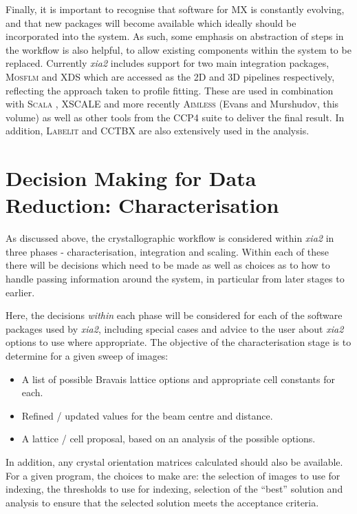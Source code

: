 \documentclass[preprint,pdf]{iucr}
\begin{document}
Finally, it is important to recognise that software for MX is
constantly evolving, and that new packages will become available which
ideally should be incorporated into the system. As such, some emphasis
on abstraction of steps in the workflow is also helpful, to allow
existing components within the system to be replaced. Currently \emph{xia2} 
includes support for two main integration packages, \textsc{Mosflm}
\cite{leslie1992rcm} and XDS \cite{Kabsch:dz5179}
which are accessed as the 2D and 3D
pipelines respectively, reflecting the approach taken to profile
fitting. These are used in combination with \textsc{Scala} \cite{Evans:ba5084}, XSCALE
and more recently \textsc{Aimless} (Evans and Murshudov, this volume) as well
as other
tools from the CCP4 suite to deliver the final result. In
addition, \textsc{Labelit} \cite{Sauter:dd5008} and CCTBX
\cite{Grosse-Kunstleve:ks0118} are also 
extensively used in the analysis.

\section{Decision Making for Data Reduction: Characterisation}

As discussed above, the crystallographic workflow is considered within
\emph{xia2} in three phases - characterisation, integration and
scaling. Within each of these there will be decisions which need to be
made as well as choices as to how to handle passing information
around the system, in particular from later stages to earlier. 

Here, the decisions \emph{within} each phase will be considered for
each of the software packages used by \emph{xia2},
including special cases and
advice to the user about \emph{xia2} options to use where
appropriate. The objective of the characterisation stage is to
determine for a given sweep of images:

\begin{itemize}
\item{A list of possible Bravais lattice options and appropriate cell
    constants for each.}
\item{Refined / updated values for the beam centre and distance.}
\item{A lattice / cell proposal, based on an analysis of the possible
    options.}
\end{itemize}

\noindent
In addition, any crystal orientation
matrices calculated
should also be available. For a given program, the choices to make
are: the selection of images to use for indexing, the thresholds to
use for indexing, selection of the ``best'' solution and analysis to
ensure that the selected solution meets the acceptance criteria. 
\end{document}
